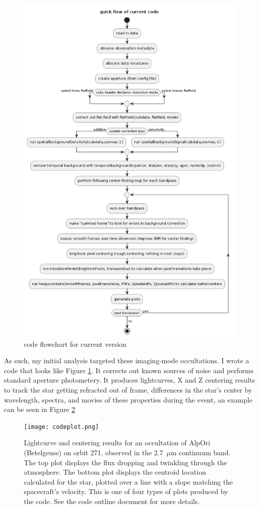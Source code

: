 \documentclass[12pt]{article}
\begin{document}
\begin{figure}[h!]
  \centering
  \includegraphics[width=0.7\linewidth]{codeflow.png}
  \caption{code flowchart for current version}
  \label{fig:codeoverview}
\end{figure}

As such, my initial analysis targeted these imaging-mode occultations.  I wrote
a code that looks like Figure \ref{fig:codeoverview}. It corrects out known
sources of noise and performs standard aperture photometery. It produces
lightcurves, X and Z centering results to track the star getting refracted out
of frame, differences in the star's center by wavelength, spectra, and movies
of these properties during the event, an example can be seen in Figure \ref{fig:codeplots}

\begin{figure}[h!]
  \centering
  \texttt{[image: codeplot.png]}
  \caption{Lightcurve and centering results for an occultation of AlpOri
(Betelgeuse) on orbit 271, observed in the 2.7~$\mu$m continuum band. The top
plot displays the flux dropping and twinkling through the atmosphere. The
bottom plot displays the centroid location calculated for the star, plotted
over a line with a slope matching the spacecraft's velocity. This is one of
four types of plots produced by the code. See the code outline document for
more details.}
  \label{fig:codeplots}
\end{figure}
\end{document}
